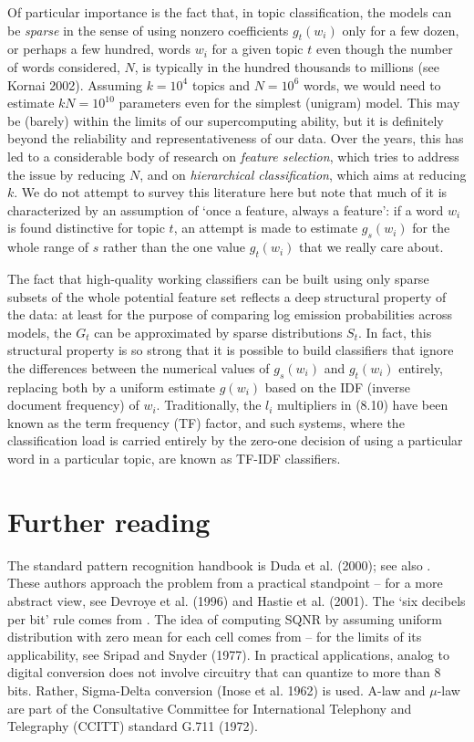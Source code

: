 Of particular importance is the fact that, in topic classification, the models
can be {\it sparse} in the sense of using nonzero coefficients $g_t(w_i)$ only
for a few dozen, or perhaps a few hundred, words $w_i$ for a given topic $t$
even though the number of words considered, $N$, is typically in the hundred
thousands to millions (see Kornai 2002).\nocite{Kornai:2002} Assuming $k=10^4$
topics and $N=10^6$ words, we would need to estimate $kN=10^{10}$ parameters
even for the simplest (unigram) model. This may be (barely) within the limits
of our supercomputing ability, but it is definitely beyond the reliability and
representativeness of our data. Over the years, this has led to a considerable
body of research on {\it feature selection}, which tries to address the issue
by reducing $N$, and on {\it hierarchical classification}, which aims at
reducing $k$. We do not attempt to survey this literature here but note that
much of it is characterized by an assumption of `once a feature, always a
feature': if a word $w_i$ is found distinctive for topic $t$, an attempt is
made to estimate $g_s(w_i)$ for the whole range of $s$ rather than the one
value $g_t(w_i)$ that we really care about.

The fact that high-quality working classifiers can be built using only sparse
subsets of the whole potential feature set reflects a deep structural property
of the data: at least for the purpose of comparing log emission probabilities
across models, the $G_t$ can be approximated by sparse distributions $S_t$. In
fact, this structural property is so strong that it is possible to build
classifiers that ignore the differences between the numerical values of
$g_s(w_i)$ and $g_t(w_i)$ entirely, replacing both by a uniform estimate
$g(w_i)$ based on the IDF (inverse document frequency) of
$w_i$. Traditionally, the $l_i$ multipliers in (8.10) have been known as the
term frequency (TF) factor, and such systems, where the classification load is
carried entirely by the zero-one decision of using a particular word in a
particular topic, are known as TF-IDF classifiers.

\section{Further reading}

The standard pattern recognition handbook is Duda et
al. (2000);\nocite{Duda:2000} see also . These authors
approach the problem from a practical standpoint -- for a more abstract view,
see Devroye et al. (1996)\nocite{Devroye:1996} and Hastie et al.
(2001).\nocite{Hastie:2001} The `six decibels per bit' rule comes from
. The idea of computing SQNR by assuming uniform
distribution with zero mean for each cell comes from  --
for the limits of its applicability, see Sripad and Snyder
(1977).\nocite{Sripad:1977} In practical applications, analog to digital
conversion does not involve circuitry that can quantize to more than 8 bits.
Rather, Sigma-Delta conversion (Inose et al. 1962)\nocite{Inose:1962} is
used.  A-law and $\mu$-law are part of the Consultative Committee for
International Telephony and Telegraphy (CCITT) standard G.711
(1972).

